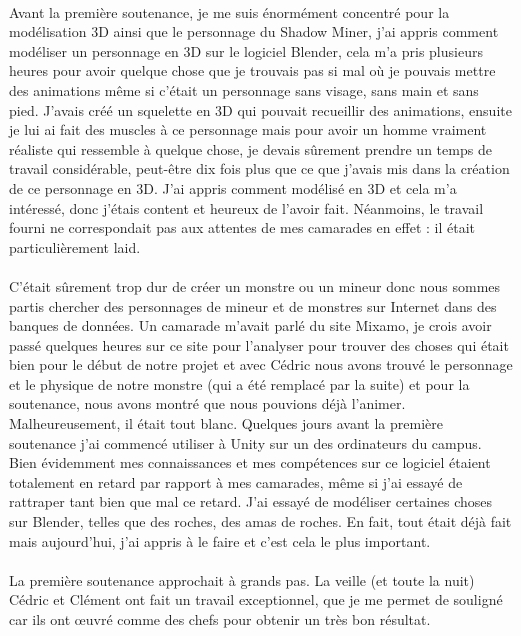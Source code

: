 \documentclass[titlepage, 13px, a4paper]{report}
\begin{document}
\paragraph{} \hspace{0pt}
Avant la première soutenance, je me suis énormément concentré pour la modélisation 3D ainsi que le personnage 
du Shadow Miner, j’ai appris comment modéliser un personnage en 3D sur le logiciel Blender, 
cela m’a pris plusieurs heures pour avoir quelque chose que je trouvais pas si mal où je pouvais mettre 
des animations même si c’était un personnage sans visage, sans main et sans pied. J’avais créé un squelette 
en 3D qui pouvait recueillir des animations, ensuite je lui ai fait des muscles à ce personnage mais pour 
avoir un homme vraiment réaliste qui ressemble à quelque chose, je devais sûrement prendre un temps de travail 
considérable, peut-être dix fois plus que ce que j’avais mis dans la création de ce personnage en 3D. 
J’ai appris comment modélisé en 3D et cela m’a intéressé, donc j’étais content et heureux de l’avoir fait. 
Néanmoins, le travail fourni ne correspondait pas aux attentes de mes camarades en effet : il était particulièrement 
laid. \\ \\
C’était sûrement trop dur de créer un monstre 
ou un mineur donc nous sommes partis chercher des personnages de mineur et de monstres sur Internet dans des 
banques de données. Un camarade m’avait parlé du site Mixamo, je crois avoir passé quelques heures sur ce site 
pour l’analyser pour trouver des choses qui était bien pour le début de notre projet et avec Cédric nous avons 
trouvé le personnage et le physique de notre monstre (qui a été remplacé par la suite) et pour la soutenance, nous 
avons montré que nous pouvions déjà l’animer. Malheureusement, il était tout blanc. 
Quelques jours avant la première soutenance j’ai commencé utiliser à Unity sur un des ordinateurs du campus. 
Bien évidemment mes connaissances et mes compétences sur ce logiciel étaient totalement en retard par rapport à mes 
camarades, même si j’ai essayé de rattraper tant bien que mal ce retard. J’ai essayé de modéliser certaines 
choses sur Blender, telles que des roches, des amas de roches. En fait, tout était déjà fait mais aujourd’hui, 
j’ai appris à le faire et c’est cela le plus important. \\ \\
La première soutenance approchait à grands pas. 
La veille (et toute la nuit) Cédric et Clément ont fait un travail exceptionnel, que 
je me permet de souligné car ils ont œuvré comme des chefs pour obtenir un très bon résultat. \\
\end{document}
